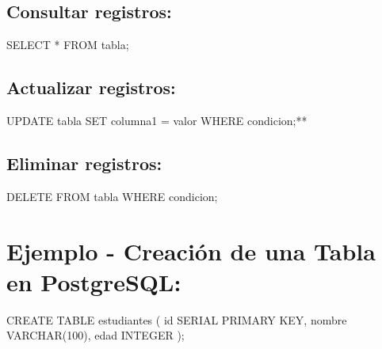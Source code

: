 \documentclass[
  a4paper,
  DIV=11,
  numbers=noendperiod,
  onepage,
  openany]{scrreprt}
\newenvironment{Shaded}{\begin{snugshade}}{\end{snugshade}}
\newcommand{\DataTypeTok}[1]{\textcolor[rgb]{0.68,0.00,0.00}{#1}}
\newcommand{\DecValTok}[1]{\textcolor[rgb]{0.68,0.00,0.00}{#1}}
\newcommand{\KeywordTok}[1]{\textcolor[rgb]{0.00,0.23,0.31}{#1}}
\newcommand{\NormalTok}[1]{\textcolor[rgb]{0.00,0.23,0.31}{#1}}
\newcommand{\OperatorTok}[1]{\textcolor[rgb]{0.37,0.37,0.37}{#1}}
\begin{document}
\hypertarget{consultar-registros}{%
\subsection{Consultar registros:}\label{consultar-registros}}

\begin{Shaded}
\begin{Highlighting}[]
\KeywordTok{SELECT} \OperatorTok{*} \KeywordTok{FROM}\NormalTok{ tabla;}
\end{Highlighting}
\end{Shaded}

\hypertarget{actualizar-registros}{%
\subsection{Actualizar registros:}\label{actualizar-registros}}

\begin{Shaded}
\begin{Highlighting}[]
\KeywordTok{UPDATE}\NormalTok{ tabla }\KeywordTok{SET}\NormalTok{ columna1 }\OperatorTok{=}\NormalTok{ valor }\KeywordTok{WHERE}\NormalTok{ condicion;}\OperatorTok{**}
\end{Highlighting}
\end{Shaded}

\hypertarget{eliminar-registros}{%
\subsection{Eliminar registros:}\label{eliminar-registros}}

\begin{Shaded}
\begin{Highlighting}[]
\KeywordTok{DELETE} \KeywordTok{FROM}\NormalTok{ tabla }\KeywordTok{WHERE}\NormalTok{ condicion;}
\end{Highlighting}
\end{Shaded}

\hypertarget{ejemplo---creaciuxf3n-de-una-tabla-en-postgresql}{%
\section{Ejemplo - Creación de una Tabla en
PostgreSQL:}\label{ejemplo---creaciuxf3n-de-una-tabla-en-postgresql}}

\begin{Shaded}
\begin{Highlighting}[]
\KeywordTok{CREATE} \KeywordTok{TABLE}\NormalTok{ estudiantes (}
    \KeywordTok{id}\NormalTok{ SERIAL }\KeywordTok{PRIMARY} \KeywordTok{KEY}\NormalTok{,}
\NormalTok{    nombre }\DataTypeTok{VARCHAR}\NormalTok{(}\DecValTok{100}\NormalTok{),}
\NormalTok{    edad }\DataTypeTok{INTEGER}
\NormalTok{);}
\end{Highlighting}
\end{Shaded}
\end{document}
